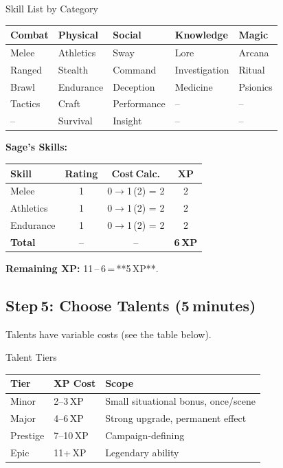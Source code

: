 \documentclass[10pt]{article}
\begin{document}
\begin{charbox}{Skill List by Category}
    \begin{tabular}{p{3cm} p{3cm} p{3cm} p{3cm} p{3cm}}
        \toprule
        \textbf{Combat} & \textbf{Physical} & \textbf{Social} & \textbf{Knowledge} & \textbf{Magic} \\
        \midrule
        Melee      & Athletics   & Sway      & Lore & Arcana \\
        Ranged     & Stealth     & Command   & Investigation & Ritual \\
        Brawl      & Endurance   & Deception & Medicine      & Psionics \\
        Tactics    & Craft       & Performance & --          & -- \\
        --          & Survival    & Insight   & --          & -- \\
        \bottomrule
    \end{tabular}
\end{charbox}

\textbf{Sage's Skills:}
\begin{tabular}{p{3cm} c c c}
    \toprule
    \textbf{Skill} & \textbf{Rating} & \textbf{Cost Calc.} & \textbf{XP}\\
    \midrule
    Melee   & 1 & 0$\rightarrow$1 (2) = 2 & 2\\
    Athletics&1 & 0$\rightarrow$1 (2) = 2 & 2\\
    Endurance&1 & 0$\rightarrow$1 (2) = 2 & 2\\
    \midrule
    \textbf{Total} & -- & -- & \textbf{6 XP}\\
    \bottomrule
\end{tabular}
\textbf{Remaining XP:} 11 -- 6 = **5 XP**.

\subsection*{Step 5: Choose Talents (5 minutes)}
Talents have variable costs (see the table below).  

\begin{charbox}{Talent Tiers}
    \begin{tabular}{p{3cm} p{3cm} p{8cm}}
        \toprule
        \textbf{Tier} & \textbf{XP Cost} & \textbf{Scope} \\
        \midrule
        Minor   & 2--3 XP & Small situational bonus, once/scene \\
        Major   & 4--6 XP & Strong upgrade, permanent effect \\
        Prestige& 7--10 XP & Campaign-defining \\
        Epic    & 11+ XP & Legendary ability \\
        \bottomrule
    \end{tabular}
\end{charbox}
\end{document}

